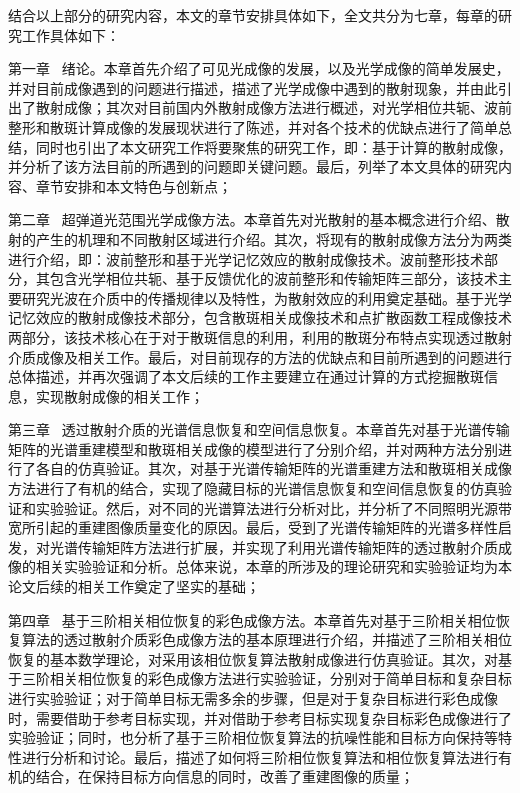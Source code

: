 结合以上部分的研究内容，本文的章节安排具体如下，全文共分为七章，每章的研究工作具体如下：

第一章 \ 绪论。本章首先介绍了可见光成像的发展，以及光学成像的简单发展史，并对目前成像遇到的问题进行描述，描述了光学成像中遇到的散射现象，并由此引出了散射成像；其次对目前国内外散射成像方法进行概述，对光学相位共轭、波前整形和散斑计算成像的发展现状进行了陈述，并对各个技术的优缺点进行了简单总结，同时也引出了本文研究工作将要聚焦的研究工作，即：基于计算的散射成像，并分析了该方法目前的所遇到的问题即关键问题。最后，列举了本文具体的研究内容、章节安排和本文特色与创新点；

第二章 \ 超弹道光范围光学成像方法。本章首先对光散射的基本概念进行介绍、散射的产生的机理和不同散射区域进行介绍。其次，将现有的散射成像方法分为两类进行介绍，即：波前整形和基于光学记忆效应的散射成像技术。波前整形技术部分，其包含光学相位共轭、基于反馈优化的波前整形和传输矩阵三部分，该技术主要研究光波在介质中的传播规律以及特性，为散射效应的利用奠定基础。基于光学记忆效应的散射成像技术部分，包含散斑相关成像技术和点扩散函数工程成像技术两部分，该技术核心在于对于散斑信息的利用，利用的散斑分布特点实现透过散射介质成像及相关工作。最后，对目前现存的方法的优缺点和目前所遇到的问题进行总体描述，并再次强调了本文后续的工作主要建立在通过计算的方式挖掘散斑信息，实现散射成像的相关工作；

第三章 \ 透过散射介质的光谱信息恢复和空间信息恢复。本章首先对基于光谱传输矩阵的光谱重建模型和散斑相关成像的模型进行了分别介绍，并对两种方法分别进行了各自的仿真验证。其次，对基于光谱传输矩阵的光谱重建方法和散斑相关成像方法进行了有机的结合，实现了隐藏目标的光谱信息恢复和空间信息恢复的仿真验证和实验验证。然后，对不同的光谱算法进行分析对比，并分析了不同照明光源带宽所引起的重建图像质量变化的原因。最后，受到了光谱传输矩阵的光谱多样性启发，对光谱传输矩阵方法进行扩展，并实现了利用光谱传输矩阵的透过散射介质成像的相关实验验证和分析。总体来说，本章的所涉及的理论研究和实验验证均为本论文后续的相关工作奠定了坚实的基础；

第四章 \ 基于三阶相关相位恢复的彩色成像方法。本章首先对基于三阶相关相位恢复算法的透过散射介质彩色成像方法的基本原理进行介绍，并描述了三阶相关相位恢复的基本数学理论，对采用该相位恢复算法散射成像进行仿真验证。其次，对基于三阶相关相位恢复的彩色成像方法进行实验验证，分别对于简单目标和复杂目标进行实验验证；对于简单目标无需多余的步骤，但是对于复杂目标进行彩色成像时，需要借助于参考目标实现，并对借助于参考目标实现复杂目标彩色成像进行了实验验证；同时，也分析了基于三阶相位恢复算法的抗噪性能和目标方向保持等特性进行分析和讨论。最后，描述了如何将三阶相位恢复算法和相位恢复算法进行有机的结合，在保持目标方向信息的同时，改善了重建图像的质量；


